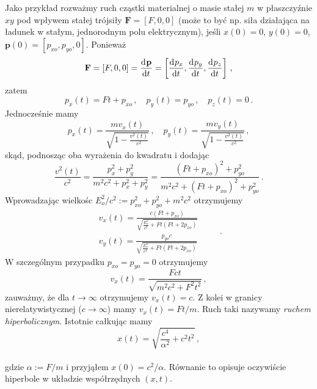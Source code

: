 \documentclass[../main.tex]{subfiles}
\begin{document}
Jako przykład rozważmy ruch cząstki materialnej o masie stałej \(m\) w płaszczyźnie \(xy\) pod wpływem stałej trójsiły \(\mathbf{F}=[F,0,0]\) (może to być np. siła działająca na ładunek w stałym, jednorodnym polu elektrycznym), jeśli \(x(0)=0\), \(y(0)=0\), \(\mathbf{p}(0)=[p_{xo},p_{yo},0]\). Ponieważ
\begin{equation*}
    \mathbf{F}=[F,0,0]=\dv[]{\mathbf{p}}{t}=\left[\dv[]{p_x}{t},\dv[]{p_y}{t},\dv[]{p_z}{t}\right]\,,
\end{equation*}
zatem
\begin{equation*}
    p_x(t)=Ft+p_{xo}\,,\quad p_y(t)=p_{yo}\,,\quad p_z(t)=0\,.
\end{equation*}
Jednocześnie mamy
\begin{equation*}
    p_x(t)=\frac{mv_x(t)}{\sqrt{1-\frac{v^2(t)}{c^2}}}\,,\quad p_y(t)=\frac{mv_y(t)}{\sqrt{1-\frac{v^2(t)}{c^2}}}\,,
\end{equation*}
skąd, podnosząc oba wyrażenia do kwadratu i dodając
\begin{equation*}
    \frac{v^2(t)}{c^2}=\frac{p_x^2+p_y^2}{m^2c^2+p_x^2+p_y^2}=\frac{(Ft+p_{xo})^2+p^2_{yo}}{m^2c^2+(Ft+p_{xo})^2+p^2_{yo}}\,.
\end{equation*}
Wprowadzając wielkośc \(E_o^2/c^2:=p_{xo}^2+p_{yo}^2+m^2c^2\) otrzymujemy
\begin{equation*}
\begin{split}
    v_x(t)=\frac{c(Ft+p_{xo})}{\sqrt{\frac{E_o^2}{c^2}+Ft(Ft+2p_{xo})}}\\
    v_y(t)=\frac{p_{yo}c}{\sqrt{\frac{E_o^2}{c^2}+Ft(Ft+2p_{xo})}}
\end{split}\quad\quad\,.
\end{equation*}
W szczególnym przypadku \(p_{xo}=p_{yo}=0\) otrzymujemy
\begin{equation*}
    v_x(t)=\frac{Fct}{\sqrt{m^2c^2+F^2t^2}}\,,
\end{equation*}
zauważmy, że dla \(t\to\infty\) otrzymujemy \(v_x(t)=c\). Z kolei w granicy nierelatywistycznej (\(c\to\infty\)) mamy \(v_x(t)=Ft/m\). Ruch taki nazywamy \textit{ruchem hiperbolicznym}. Istotnie całkując mamy
\begin{equation*}
    x(t)=\sqrt{\frac{c^4}{\alpha^2}+c^2t^2}\,,
\end{equation*}\\
gdzie \(\alpha:=F/m\) i przyjąłem \(x(0)=c^2/\alpha\). Równanie to opisuje oczywiście hiperbole w układzie współrzędnych \((x,t)\).
\end{document}
